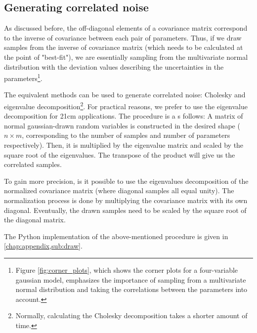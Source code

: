 \documentclass[12pt, TexShade, letterpaper]{report}
\begin{document}
\subsection{Generating correlated noise}
\label{chap:method,sub:correlated noise}
As discussed before, the off-diagonal elements of a covariance matrix correspond to the inverse of covariance between each pair of parameters. Thus, if we draw samples from the inverse of covariance matrix (which needs to be calculated at the point of "best-fit"), we are essentially sampling from the multivariate normal distribution with the deviation values describing the uncertainties in the parameters\footnote{Figure \ref{fig:corner_plots}, which shows the corner plots for a four-variable gaussian model, emphasizes the importance of sampling from a multivariate normal distribution and taking the correlations between the parameters into account.}.\par
The equivalent methods can be used to generate correlated noise: Cholesky and eigenvalue decomposition\footnote{Normally, calculating the Cholesky decomposition takes a shorter amount of time.}. For practical reasons, we prefer to use the eigenvalue decomposition for 21cm applications. The procedure is a s follows: A matrix of normal gaussian-drawn random variables is constructed in the desired shape ($n \times m$, corresponding to the number of samples and number of parameters respectively). Then, it is multiplied by the eigenvalue matrix and scaled by the square root of the eigenvalues. The transpose of the product will give us the correlated samples. \par
To gain more precision, is it possible to use the eigenvalues decomposition of the normalized covariance matrix (where diagonal samples all equal unity). The normalization process is done by multiplying the covariance matrix with its own diagonal. Eventually, the drawn samples need to be scaled by the square root of the diagonal matrix.\par
The Python implementation of the above-mentioned procedure is given in \ref{chap:appendix,sub:draw}.
\end{document}
